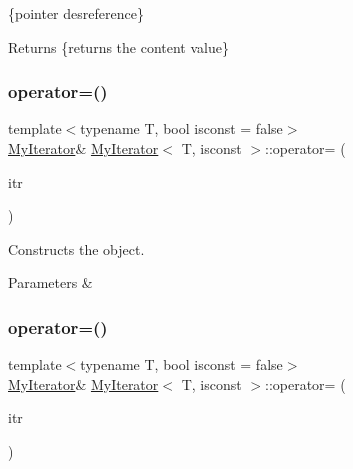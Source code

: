 \{pointer desreference\} 

\begin{DoxyReturn}{Returns}
\{returns the content value\} 
\end{DoxyReturn}
\mbox{\label{classMyIterator_ab388cff932fc5f108bc530acdb18fa4f}} 
\subsubsection{\texorpdfstring{operator=()}{operator=()}\hspace{0.1cm}{\footnotesize\ttfamily [1/2]}}
{\footnotesize\ttfamily template$<$typename T, bool isconst = false$>$ \\
\hyperlink{classMyIterator}{My\+Iterator}\& \hyperlink{classMyIterator}{My\+Iterator}$<$ T, isconst $>$\+::operator= (\begin{DoxyParamCaption}\item[{const \hyperlink{classMyIterator}{My\+Iterator}$<$ T, isconst $>$ \&}]{itr }\end{DoxyParamCaption})\hspace{0.3cm}{\ttfamily [default]}}



Constructs the object. 


\begin{DoxyParams}{Parameters}
{\em } & \\
\hline
\end{DoxyParams}
\mbox{\label{classMyIterator_ad0d1d4cf8fb2db01a03393a0c704929d}} 
\subsubsection{\texorpdfstring{operator=()}{operator=()}\hspace{0.1cm}{\footnotesize\ttfamily [2/2]}}
{\footnotesize\ttfamily template$<$typename T, bool isconst = false$>$ \\
\hyperlink{classMyIterator}{My\+Iterator}\& \hyperlink{classMyIterator}{My\+Iterator}$<$ T, isconst $>$\+::operator= (\begin{DoxyParamCaption}\item[{const reference}]{itr }\end{DoxyParamCaption})\hspace{0.3cm}{\ttfamily [inline]}}



